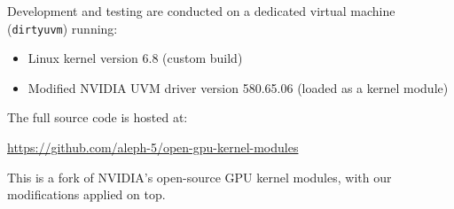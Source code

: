 
Development and testing are conducted on a dedicated virtual machine (\texttt{dirtyuvm}) running:
\begin{itemize}
    \item Linux kernel version 6.8 (custom build)
    \item Modified NVIDIA UVM driver version 580.65.06 (loaded as a kernel module)
\end{itemize}

The full source code is hosted at:
\begin{center}
    \url{https://github.com/aleph-5/open-gpu-kernel-modules}
\end{center}
This is a fork of NVIDIA's open-source GPU kernel modules, with our modifications applied on top.
